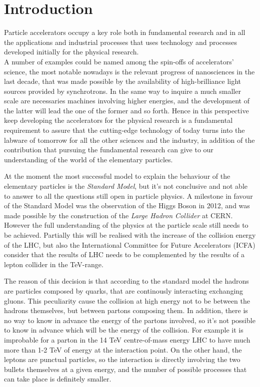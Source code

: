 \chapter{Introduction}
Particle accelerators occupy a key role both in fundamental research and in all the applications and industrial processes that uses technology and processes developed initially for the physical research.\\
A number of examples could be named among the spin-offs of accelerators' science, the most notable nowadays is the relevant progress of nanosciences in the last decade, that was made possible by the availability of high-brilliance light sources provided by synchrotrons. In the same way to inquire a much smaller scale are necessaries machines involving higher energies, and the development of the latter will lead the one of the former and so forth.
 Hence in this perspective keep developing the accelerators for the physical research is a fundamental requirement to assure that the cutting-edge technology of today turns into the labware of tomorrow for all the other sciences and the industry, in addition of the contribution that pursuing the fundamental research can give to our understanding of the world of the elementary particles.


At the moment the most successful model to explain the behaviour of the elementary particles is the \textit{Standard Model}, but it's not conclusive and not able to answer to all the questions still open in particle physics. A milestone in favour of the Standard Model was the observation of the Higgs Boson in 2012, and was made possible by the construction of the \textit{Large Hadron Collider} at CERN\cite{CMS:higgs,ATLAS:higgs,LHC:design}. However the full understanding of the physics at the particle scale still needs to be achieved. Partially this will be realised with the increase of the collision energy of the LHC, but also the International Committee for Future Accelerators (ICFA) consider that the results of LHC needs to be complemented by the results of a lepton collider in the TeV-range\cite{ICFA:linStat}.

The reason of this decision is that according to the standard model the hadrons are particles composed by quarks, that are continously interacting exchanging gluons. This peculiarity cause the collision at high energy not to be between the hadrons themselves, but between partons composing them. In addition, there is no way to know in advance the energy of the partons involved, so it's not possible to know in advance which will be the energy of the collision. For example it is improbable for a parton in the 14 TeV centre-of-mass energy LHC to have much more than 1-2 TeV of energy at the interaction point\cite{LHC:partonDistrib}. On the other hand, the leptons are punctual particles, so the interaction is directly involving the two bullets themselves at a given energy, and the number of possible processes that can take place is definitely smaller. 

